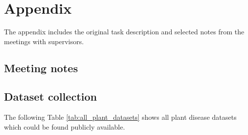 \appendix
\chapter{Appendix}

The appendix includes the original task description and selected notes from the meetings with supervisors.



\label{appendix:task_description}

\section{Meeting notes}
\label{subsection:notes}

\newpage
\section{Dataset collection}
\label{appendix:datasets_tables}
The following Table \ref{tab:all_plant_datasets} shows all plant disease datasets which could be found publicly available. 

